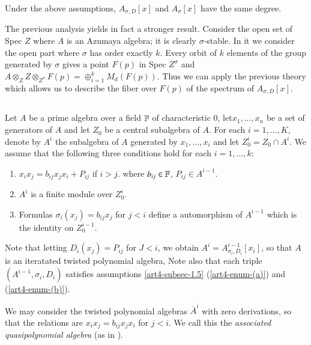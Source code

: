 \begin{coro*}
Under the above assumptions, $A_{\sigma, D}[x]$ and $A_{\sigma}[x]$ have the same degree.
\end{coro*}
\begin{remark*}
The previous analysis yields in fact a stronger result. Consider the open set of Spec $Z$ where $A$ is an Azumaya algebra; it is clearly $\sigma$-stable. In it we consider the open part where $\sigma $ has order exactly $k$. Every orbit of $k$ elements of the group generated by $\sigma$ gives a point $F(p)$ in Spec $Z^{\sigma}$ and $A\otimes_{Z}Z\otimes _{Z^{\sigma}}F(p) = \oplus_{i=1}^{k}M_{d}(F(p))$. Thus we can apply the previous theory which allows us to describe the fiber over $F(p)$ of the spectrum of $A_{\sigma, D}[x]$.
\end{remark*}

\subsection{}\label{art4-subsec-1.6}
Let $A$ be a prime algebra over a field $\mathbb{F}$ of characteristic 0, let\break $x_{1}, \ldots, x_{n}$ be a set of generators of $A$ and let $Z_{0}$ be a central subalgebra of $A$. For each $i =1, \ldots, K$, denote by $A^{i}$ the subalgebra of $A$ generated by $x_{1}, \ldots, x_{i}$ and let $Z_{0}^{i} = Z_{0}\cap A^{i}$. We assume that the following three conditions hold for each $i=1,\ldots, k$:
\begin{enumerate}[{\rm (a)}]
\item $x_{i}x_{j} = b_{ij}x_{j}x_{i} + P_{ij}$ if $i>j$. where $b_{ij}\in \mathbb{F}$, $P_{ij} \in A^{i-1}$.\label{art4-enum_(a)}
\item $A^{i}$ is a finite module over $Z_{0}^{i}$.\label{art4-enum_(b)}
\item Formulas $\sigma_{i}(x_{j}) = b_{ij}x_{j}$ for $j< i$  define a automorphism of $A^{i-1}$ which is the identity on $Z_{0}^{i-1}$.\label{art4-enum_(c)}
\end{enumerate}

Note that letting $D_{i}(x_{j}) = P_{ij}$ for $J < i$, we obtain $A^{i} = A_{\sigma_{i}, D_{i}}^{i-1}[x_{i}]$, so that $A$ is an iteratated twisted polynomial algebra, Note also that each triple $(A^{i-1}, \sigma_{i}, D_{i})$ satisfies assumptions \ref{art4-subsec-1.5} (\ref{art4-enum-(a)}) and (\ref{art4-enum-(b)}). 

We may consider the twisted polynomial algebras $\overline{A}^{i}$ with zero derivations, so that the relations are $x_{i}x_{j} = b_{ij}x_{j}x_{i}$ for $j < i$. We call this the \textit{associated quasipolynomial algebra} (as in \cite{art4-keyDK1}).

